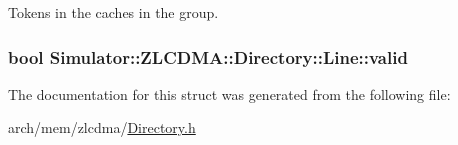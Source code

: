 Tokens in the caches in the group. 

\hypertarget{struct_simulator_1_1_z_l_c_d_m_a_1_1_directory_1_1_line_ab24710121e177d545ae12822af6967bd}{
\subsubsection[{valid}]{\setlength{\rightskip}{0pt plus 5cm}bool Simulator\+::\+Z\+L\+C\+D\+M\+A\+::\+Directory\+::\+Line\+::valid}}\label{struct_simulator_1_1_z_l_c_d_m_a_1_1_directory_1_1_line_ab24710121e177d545ae12822af6967bd}


The documentation for this struct was generated from the following file\+:\begin{DoxyCompactItemize}
\item 
arch/mem/zlcdma/\hyperlink{zlcdma_2_directory_8h}{Directory.\+h}\end{DoxyCompactItemize}
